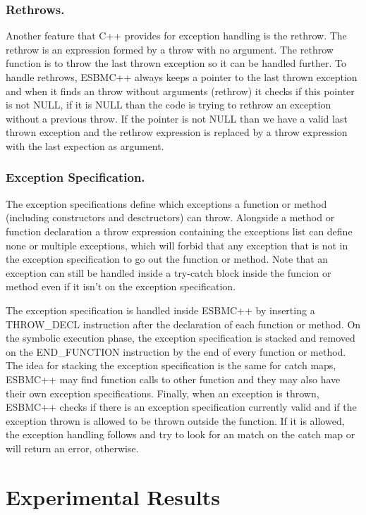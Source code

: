 \documentclass[a4paper]{llncs}
\begin{document}
\subsubsection{Rethrows.} Another feature that C++ provides for exception handling is the rethrow. The rethrow is an expression formed by
a throw with no argument. The rethrow function is to throw the last thrown exception so it can be handled further. To handle rethrows,
ESBMC++ always keeps a pointer to the last thrown exception and when it finds an throw without arguments (rethrow) it checks if this pointer
is not NULL, if it is NULL than the code is trying to rethrow an exception without a previous throw. If the pointer is not NULL than we have
a valid last thrown exception and the rethrow expression is replaced by a throw expression with the last expection as argument.

\subsubsection{Exception Specification.} The exception specifications define which exceptions a function or method (including constructors
and desctructors) can throw. Alongside a method or function declaration a throw expression containing the exceptions list can define none or
multiple exceptions, which will forbid that any exception that is not in the exception specification to go out the function or method. Note
that an exception can still be handled inside a try-catch block inside the funcion or method even if it isn't on the exception specification.

The exception specification is handled inside ESBMC++ by inserting a THROW\_DECL instruction after the declaration of each function or method.
On the symbolic execution phase, the exception specification is stacked and removed on the END\_FUNCTION instruction by the end of every
function or method. The idea for stacking the exception specification is the same for catch maps, ESBMC++ may find function calls to other
function and they may also have their own exception specifications. Finally, when an exception is thrown, ESBMC++ checks if there is an
exception specification currently valid and if the exception thrown is allowed to be thrown outside the function. If it is allowed, the
exception handling follows and try to look for an match on the catch map or will return an error, otherwise.

\section{Experimental Results}
\end{document}
